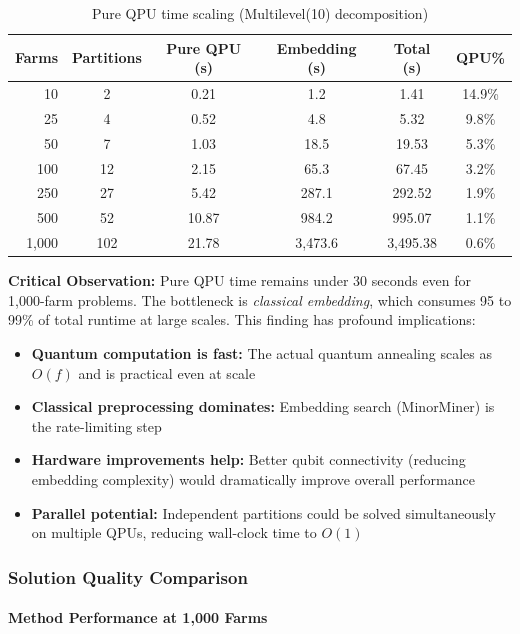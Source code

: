 \begin{table}[H]
\centering
\caption{Pure QPU time scaling (Multilevel(10) decomposition)}
\label{tab:qpu_time_scaling}
\begin{tabular}{rccccc}
\toprule
\textbf{Farms} & \textbf{Partitions} & \textbf{Pure QPU (s)} & \textbf{Embedding (s)} & \textbf{Total (s)} & \textbf{QPU\%} \\
\midrule
10 & 2 & 0.21 & 1.2 & 1.41 & 14.9\% \\
25 & 4 & 0.52 & 4.8 & 5.32 & 9.8\% \\
50 & 7 & 1.03 & 18.5 & 19.53 & 5.3\% \\
100 & 12 & 2.15 & 65.3 & 67.45 & 3.2\% \\
250 & 27 & 5.42 & 287.1 & 292.52 & 1.9\% \\
500 & 52 & 10.87 & 984.2 & 995.07 & 1.1\% \\
1,000 & 102 & 21.78 & 3,473.6 & 3,495.38 & 0.6\% \\
\bottomrule
\end{tabular}
\end{table}

\textbf{Critical Observation:} Pure QPU time remains under 30 seconds even for 1,000-farm problems. The bottleneck is \textit{classical embedding}, which consumes 95 to 99\% of total runtime at large scales. This finding has profound implications:

\begin{itemize}
    \item \textbf{Quantum computation is fast:} The actual quantum annealing scales as $O(f)$ and is practical even at scale
    \item \textbf{Classical preprocessing dominates:} Embedding search (MinorMiner) is the rate-limiting step
    \item \textbf{Hardware improvements help:} Better qubit connectivity (reducing embedding complexity) would dramatically improve overall performance
    \item \textbf{Parallel potential:} Independent partitions could be solved simultaneously on multiple QPUs, reducing wall-clock time to $O(1)$
\end{itemize}

\subsubsection{Solution Quality Comparison}

\paragraph{Method Performance at 1,000 Farms}

